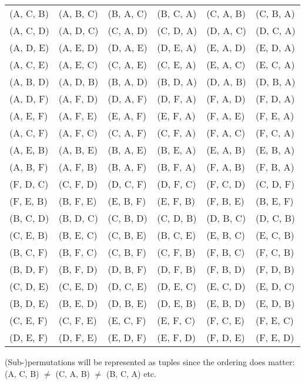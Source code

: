 \documentclass[output=paper,colorlinks,citecolor=brown,draft]{langscibook}
\begin{document}
\begin{enumerate}
\begin{longtable}{l l l l l l} 
	(A,  C, B)              & (A, B, C)                 & (B, A, C)                 & (B, C, A)     & (C, A, B)     & (C, B, A) \\
	(A, C, D) 				& 	(A, D, C)				& 	(C, A, D)				& 	(C, D, A)	& 	(D, A, C) 	&	 (D, C, A) \\
	(A, D, E) 				& 	(A, E, D)				& 	(D, A, E) 				& 	(D, E, A)	& 	(E, A, D) 	& 	(E, D, A) \\
	(A, C, E) 				& 	(A, E, C)				& 	(C, A, E) 				&	 (C, E, A)	& 	(E, A, C) 	&	 (E, C, A) \\
	(A, B, D) 				& 	(A, D, B)				& 	(B, A, D) 				& 	(B, D, A)	& 	(D, A, B) 	& 	(D, B, A) \\
	(A, D, F) 				& 	(A, F, D)				& 	(D, A, F) 				& 	(D, F, A)	& 	(F, A, D) 	& 	(F, D, A) \\
	(A, E, F) 				& 	(A, F, E) 				& 	(E, A, F) 				& 	(E, F, A) 	& 	(F, A, E) 	& 	(F, E, A) \\
	(A, C, F) 				& 	(A, F, C)				& 	(C, A, F) 				& 	(C, F, A)	& 	(F, A, C) 	& 	(F, C, A) \\
	(A, E, B) 				& 	(A, B, E) 				& 	(B, A, E) 				& 	(B, E, A) 	& 	(E, A, B) 	& 	(E, B, A) \\
	(A, B, F) 				& 	(A, F, B) 				& 	(B, A, F) 				& 	(B, F, A) 	& 	(F, A, B) 	& 	(F, B, A) \\
	(F, D, C) 				&	(C, F, D) 				&	 (D, C, F) 				& 	(D, F, C) 	&	 (F, C, D) 	& 	(C, D, F) \\ 
	(F, E, B) 				& 	(B, F, E) 				& 	(E, B, F) 				& 	(E, F, B) 	& 	(F, B, E) 	& 	(B, E, F) \\
	(B, C, D) 				& 	(B, D, C)				& 	(C, B, D) 				& 	(C, D, B)	& 	(D, B, C) 	& 	(D, C, B) \\
	(C, E, B) 				& 	(B, E, C) 				& 	(C, B, E) 				& 	(B, C, E) 	& 	(E, B, C) 	& 	(E, C, B) \\
	(B, C, F) 				& 	(B, F, C) 				& 	(C, B, F) 				& 	(C, F, B) 	& 	(F, B, C) 	& 	(F, C, B) \\
	(B, D, F) 				& 	(B, F, D) 				& 	(D, B, F) 				& 	(D, F, B) 	& 	(F, B, D) 	& 	(F, D, B) \\
	(C, D, E) 				& 	(C, E, D)				& 	(D, C, E) 				& 	(D, E, C)	& 	(E, C, D) 	& 	(E, D, C) \\ 
	(B, D, E) 				& 	(B, E, D) 				& 	(D, B, E) 				& 	(D, E, B) 	& 	(E, B, D) 	& 	(E, D, B) \\
	(C, E, F) 				& 	(C, F, E) 				& 	(E, C, F) 				& 	(E, F, C) 	& 	(F, C, E) 	&	 (F, E, C) \\
	(D, E, F) 				& 	(D, F, E) 				& 	(E, D, F) 				& 	(E, F, D) 	& 	(F, D, E) 	& 	(F, E, D) \\  
 \end{longtable}

(Sub-)permutations will be represented as tuples since the ordering does matter: (A,  C, B) $\not=$ (C, A, B) $\not=$ (B, C, A) etc.  
\end{enumerate} 
\end{document}
